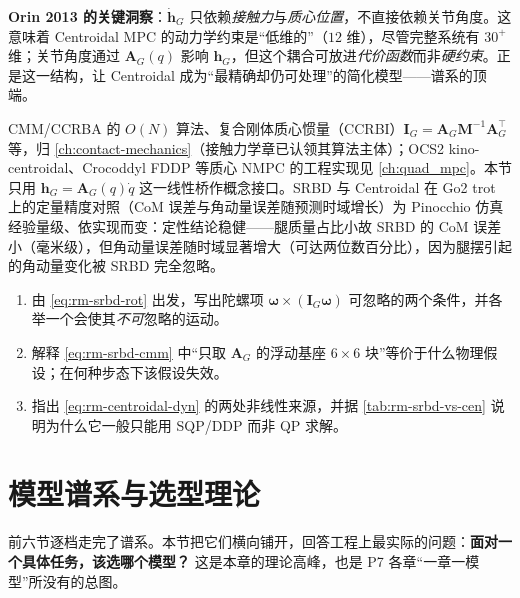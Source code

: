 \begin{insight}
\textbf{Orin 2013 的关键洞察}\cite{orin2013centroidal}：$\dot{\mathbf{h}}_G$ 只依赖\emph{接触力}与\emph{质心位置}，不直接依赖关节角度。这意味着 Centroidal MPC 的动力学约束是“低维的”（$12$ 维），尽管完整系统有 $30^+$ 维；关节角度通过 $\mathbf{A}_G(q)$ 影响 $\mathbf{h}_G$，但这个耦合可放进\emph{代价函数}而非\emph{硬约束}。正是这一结构，让 Centroidal 成为“最精确却仍可处理”的简化模型——谱系的顶端。
\end{insight}

\begin{note}
CMM/CCRBA 的 $O(N)$ 算法、复合刚体质心惯量（CCRBI）$\mathbf{I}_G=\mathbf{A}_G\mathbf{M}^{-1}\mathbf{A}_G^\top$ 等，归 \cref{ch:contact-mechanics}（接触力学章已认领其算法主体）\cite{orin2013centroidal}；OCS2 kino-centroidal、Crocoddyl FDDP 等质心 NMPC 的工程实现见 \cref{ch:quad_mpc}。本节只用 $\mathbf{h}_G=\mathbf{A}_G(q)\dot{q}$ 这一线性桥作概念接口。SRBD 与 Centroidal 在 Go2 trot 上的定量精度对照（CoM 误差与角动量误差随预测时域增长）为 Pinocchio 仿真经验量级、依实现而变：定性结论稳健——腿质量占比小故 SRBD 的 CoM 误差小（毫米级），但角动量误差随时域显著增大（可达两位数百分比），因为腿摆引起的角动量变化被 SRBD 完全忽略。
\end{note}

\begin{exercise}
\begin{enumerate}
  \item 由 \cref{eq:rm-srbd-rot} 出发，写出陀螺项 $\boldsymbol{\omega}\times(\mathbf{I}_G\boldsymbol{\omega})$ 可忽略的两个条件，并各举一个会使其\emph{不可}忽略的运动。
  \item 解释 \cref{eq:rm-srbd-cmm} 中“只取 $\mathbf{A}_G$ 的浮动基座 $6\times 6$ 块”等价于什么物理假设；在何种步态下该假设失效。
  \item 指出 \cref{eq:rm-centroidal-dyn} 的两处非线性来源，并据 \cref{tab:rm-srbd-vs-cen} 说明为什么它一般只能用 SQP/DDP 而非 QP 求解。
\end{enumerate}
\end{exercise}

\section{模型谱系与选型理论}
\label{sec:rm-selection}

前六节逐档走完了谱系。本节把它们横向铺开，回答工程上最实际的问题：\textbf{面对一个具体任务，该选哪个模型？} 这是本章的理论高峰，也是 P7 各章“一章一模型”所没有的总图。

